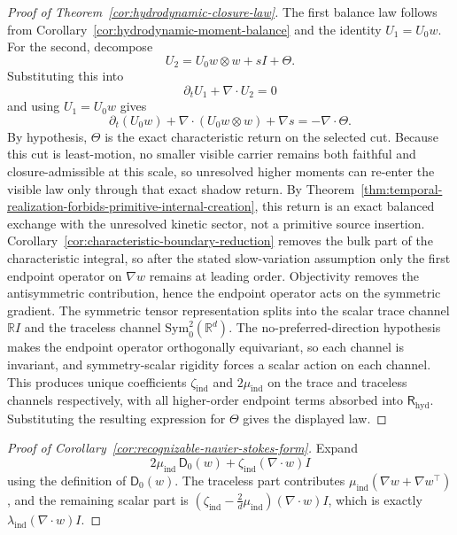 \begin{proof}[Proof of Theorem~\ref{cor:hydrodynamic-closure-law}]
\label{proof:cor:hydrodynamic-closure-law}
The first balance law follows from
Corollary~\ref{cor:hydrodynamic-moment-balance} and the identity
\(U_1=U_0 w\). For the second, decompose
\[
U_2 = U_0 w\otimes w + sI + \Theta.
\]
Substituting this into
\[
\partial_t U_1 + \nabla\!\cdot U_2 = 0
\]
and using \(U_1=U_0 w\) gives
\[
\partial_t(U_0 w)
+
\nabla\!\cdot(U_0 w\otimes w)
+
\nabla s
=
-\nabla\!\cdot \Theta.
\]
By hypothesis, \(\Theta\) is the exact characteristic return on the selected
cut. Because this cut is least-motion, no smaller visible carrier remains both
faithful and closure-admissible at this scale, so unresolved higher moments can
re-enter the visible law only through that exact shadow return. By
Theorem~\ref{thm:temporal-realization-forbids-primitive-internal-creation},
this return is an exact balanced exchange with the unresolved kinetic sector,
not a primitive source insertion.
Corollary~\ref{cor:characteristic-boundary-reduction} removes the bulk part of
the characteristic integral, so after the stated slow-variation assumption only
the first endpoint operator on \(\nabla w\) remains at leading order.
Objectivity removes the antisymmetric contribution, hence the endpoint operator
acts on the symmetric gradient. The symmetric tensor representation splits into
the scalar trace channel \(\mathbb RI\) and the traceless channel
\(\mathrm{Sym}^2_0(\mathbb R^d)\). The no-preferred-direction hypothesis makes
the endpoint operator orthogonally equivariant, so each channel is invariant,
and symmetry-scalar rigidity forces a scalar action on each channel. This
produces unique coefficients \(\zeta_{\mathrm{ind}}\) and
\(2\mu_{\mathrm{ind}}\) on the trace and traceless channels respectively, with
all higher-order endpoint terms absorbed into \(\mathsf R_{\mathrm{hyd}}\).
Substituting the resulting expression for \(\Theta\) gives the displayed law.
\end{proof}

\begin{proof}[Proof of Corollary~\ref{cor:recognizable-navier-stokes-form}]
\label{proof:cor:recognizable-navier-stokes-form}
Expand
\[
2\mu_{\mathrm{ind}}\,\mathsf D_0(w)
+
\zeta_{\mathrm{ind}}(\nabla\!\cdot w)I
\]
using the definition of \(\mathsf D_0(w)\). The traceless part contributes
\(\mu_{\mathrm{ind}}(\nabla w+\nabla w^\top)\), and the remaining scalar part is
\((\zeta_{\mathrm{ind}}-\frac{2}{d}\mu_{\mathrm{ind}})(\nabla\!\cdot w)I\),
which is exactly \(\lambda_{\mathrm{ind}}(\nabla\!\cdot w)I\).
\end{proof}


